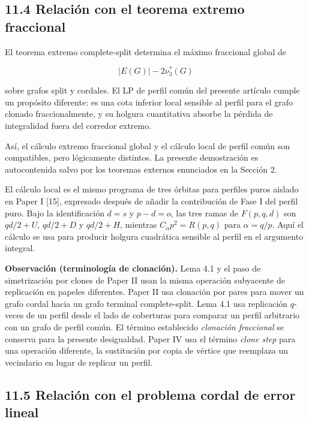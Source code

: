 \documentclass[
  spanish,
  11pt,
  a4paper,
]{article}
\begin{document}
\subsection{11.4 Relación con el teorema extremo fraccional}\label{relaciuxf3n-con-el-teorema-extremo-fraccional}

El teorema extremo complete-split determina el máximo fraccional global de

\[
|E(G)|-2\nu_3^*(G)
\]

sobre grafos split y cordales. El LP de perfil común del presente artículo cumple un propósito diferente: es una cota inferior local sensible al perfil para el grafo clonado fraccionalmente, y su holgura cuantitativa absorbe la pérdida de integralidad fuera del corredor extremo.

Así, el cálculo extremo fraccional global y el cálculo local de perfil común son compatibles, pero lógicamente distintos. La presente demostración es autocontenida salvo por los teoremas externos enunciados en la Sección 2.

El cálculo local es el mismo programa de tres órbitas para perfiles puros aislado en Paper I {[}15{]}, expresado después de añadir la contribución de Fase I del perfil puro. Bajo la identificación \(d=s\) y \(p-d=o\), las tres ramas de \(F(p,q,d)\) son \(qd/2+U\), \(qd/2+D\) y \(qd/2+H\), mientras \(C_\alpha p^2=R(p,q)\) para \(\alpha=q/p\). Aquí el cálculo se usa para producir holgura cuadrática sensible al perfil en el argumento integral.

\textbf{Observación (terminología de clonación).} Lema 4.1 y el paso de simetrización por clones de Paper II usan la misma operación subyacente de replicación en papeles diferentes. Paper II usa clonación por pares para mover un grafo cordal hacia un grafo terminal complete-split. Lema 4.1 usa replicación \(q\)-veces de un perfil desde el lado de coberturas para comparar un perfil arbitrario con un grafo de perfil común. El término establecido \emph{clonación fraccional} se conserva para la presente desigualdad. Paper IV usa el término \emph{clone step} para una operación diferente, la sustitución por copia de vértice que reemplaza un vecindario en lugar de replicar un perfil.

\subsection{11.5 Relación con el problema cordal de error lineal}\label{relaciuxf3n-con-el-problema-cordal-de-error-lineal}
\end{document}
